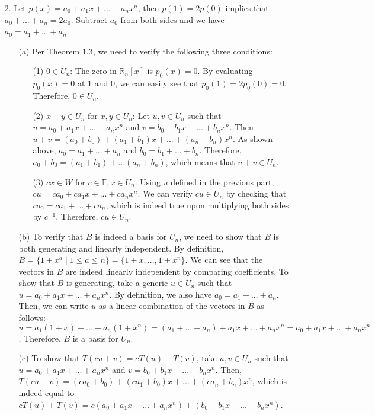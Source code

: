 \documentclass{article}
\begin{document}
\begin{itemize}
	\item [2.] Let $p(x)=a_0+a_1x+...+a_nx^n$, then $p(1)=2p(0)$ implies that $a_0+...+a_n=2a_0$. Subtract $a_0$ from both sides and we have $a_0=a_1+...+a_n$.
	      \begin{itemize}
		      \item [(a)] Per Theorem 1.3, we need to verify the following three conditions:
		            \begin{itemize}
			            \item [(1)] $0 \in U_n$: The zero in $\mathbb{R}_n[x]$ is $p_0(x)=0$. By evaluating $p_0(x)=0$ at $1$ and $0$, we can easily see that $p_0(1)=2p_0(0)=0$. Therefore, $0 \in U_n$.
			            \item [(2)] $x+y \in U_n \text{ for } x,y \in U_n$: Let $u,v \in U_n$ such that $u=a_0+a_1x+...+a_nx^n$ and $v=b_0+b_1x+...+b_nx^n$. Then $u+v=(a_0+b_0)+(a_1+b_1)x+...+(a_n+b_n)x^n$. As shown above, $a_0=a_1+...+a_n$ and $b_0=b_1+...+b_n$. Therefore, $a_0+b_0=(a_1+b_1)+...(a_n+b_n)$, which means that $u+v \in U_n$.
			            \item [(3)] $cx \in W \text{ for } c \in \mathbb{F}, x \in U_n$: Using $u$ defined in the previous part, $cu=ca_0+ca_1x+...+ca_nx^n$. We can verify $cu \in U_n$ by checking that $ca_0=ca_1+...+ca_n$, which is indeed true upon multiplying both sides by $c^{-1}$. Therefore, $cu \in U_n$.
		            \end{itemize}
		      \item [(b)] To verify that $B$ is indeed a basis for $U_n$, we need to show that $B$ is both generating and linearly independent. By definition, $B=\{1+x^a \mid 1 \leq a \leq n\}=\{1+x, ..., 1+x^n\}$. We can see that the vectors in $B$ are indeed linearly independent by comparing coefficients. To show that $B$ is generating, take a generic $u \in U_n$ such that $u=a_0+a_1x+...+a_nx^n$. By definition, we also have $a_0=a_1+...+a_n$. Then, we can write $u$ as a linear combination of the vectors in $B$ as follows: $u=a_1(1+x)+...+a_n(1+x^n)=(a_1+...+a_n)+a_1x+...+a_nx^n=a_0+a_1x+...+a_nx^n$. Therefore, $B$ is a basis for $U_n$.
		      \item [(c)] To show that $T(cu+v)=cT(u)+T(v)$, take $u,v \in U_n$ such that $u=a_0+a_1x+...+a_nx^n$ and $v=b_0+b_1x+...+b_nx^n$. Then, $T(cu+v)=(ca_0+b_0)+(ca_1+b_0)x+...+(ca_n+b_n)x^n$, which is indeed equal to $cT(u)+T(v)=c(a_0+a_1x+...+a_nx^n)+(b_0+b_1x+...+b_nx^n)$.
	      \end{itemize}
\end{itemize}
\end{document}
